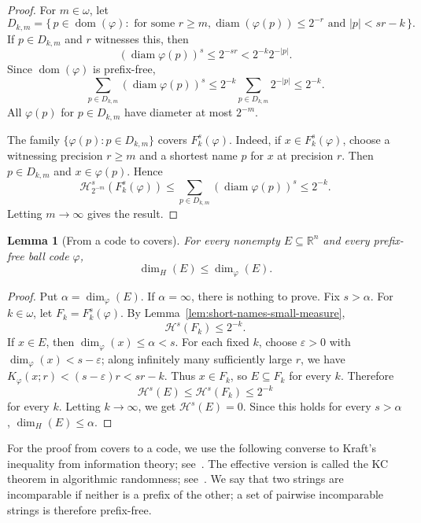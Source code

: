 \documentclass[a4paper,oneside,reqno,12pt]{amsart}
\theoremstyle{plain}
\newtheorem{lemma}[theorem]{Lemma}
\theoremstyle{definition}
\theoremstyle{remark}
\DeclareMathOperator{\dom}{dom}
\DeclareMathOperator{\diam}{diam}
\begin{document}
\begin{proof}
For \(m\in\omega\), let
\[
D_{k,m}
=
\bigl\{\,p\in\dom(\varphi):
\text{ for some }r\ge m,
\diam(\varphi(p))\le2^{-r}\text{ and }|p|<sr-k\,\bigr\}.
\]
If \(p\in D_{k,m}\) and \(r\) witnesses this, then
\[
(\diam\varphi(p))^s
\le 2^{-sr}
< 2^{-k}2^{-|p|}.
\]
Since \(\dom(\varphi)\) is prefix-free,
\[
\sum_{p\in D_{k,m}}(\diam\varphi(p))^s
\le 2^{-k}\sum_{p\in D_{k,m}}2^{-|p|}
\le 2^{-k}.
\]
All \(\varphi(p)\) for \(p\in D_{k,m}\) have diameter at most \(2^{-m}\).

The family \(\{\varphi(p):p\in D_{k,m}\}\) covers \(F_k^s(\varphi)\).  Indeed,
if \(x\in F_k^s(\varphi)\), choose a witnessing precision \(r\ge m\) and a
shortest name \(p\) for \(x\) at precision \(r\).  Then \(p\in D_{k,m}\) and
\(x\in\varphi(p)\).  Hence
\[
\mathcal H^s_{2^{-m}}(F_k^s(\varphi))
\le
\sum_{p\in D_{k,m}}(\diam\varphi(p))^s
\le 2^{-k}.
\]
Letting \(m\to\infty\) gives the result.
\end{proof}

\begin{lemma}[From a code to covers]
\label{lem:code-to-cover}
For every nonempty \(E\subseteq\mathbb R^n\) and every prefix-free ball code
\(\varphi\),
\[
\dim_H(E)\le \dim_\varphi(E).
\]
\end{lemma}

\begin{proof}
Put \(\alpha=\dim_\varphi(E)\).  If \(\alpha=\infty\), there is nothing to
prove.  Fix \(s>\alpha\).  For \(k\in\omega\), let \(F_k=F_k^s(\varphi)\).
By Lemma~\ref{lem:short-names-small-measure},
\[
\mathcal H^s(F_k)\le2^{-k}.
\]
If \(x\in E\), then \(\dim_\varphi(x)\le\alpha<s\).  For each fixed \(k\), choose
\(\varepsilon>0\) with \(\dim_\varphi(x)<s-\varepsilon\); along infinitely many
sufficiently large \(r\), we have \(K_\varphi(x;r)<(s-\varepsilon)r<sr-k\).
Thus \(x\in F_k\), so \(E\subseteq F_k\) for every \(k\).  Therefore
\[
\mathcal H^s(E)\le\mathcal H^s(F_k)\le2^{-k}
\]
for every \(k\).  Letting \(k\to\infty\), we get \(\mathcal H^s(E)=0\).  Since
this holds for every \(s>\alpha\), \(\dim_H(E)\le\alpha\).
\end{proof}

For the proof from covers to a code,
we use the following converse to Kraft's inequality from information theory;
see~\cite[Theorem~5.2.2]{CoverThomas2006}.
The effective version is called the KC theorem in algorithmic randomness;
see~\cite[Theorem~3.6.1]{DowneyHirschfeldt2010}.
We say that two strings are incomparable if neither is a prefix of the other;
a set of pairwise incomparable strings is therefore prefix-free.
\end{document}

